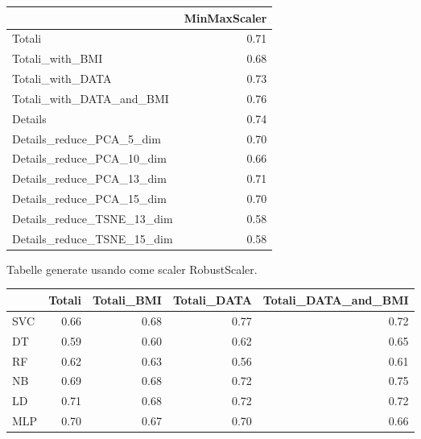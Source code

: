 \documentclass[12pt,italian]{report}
\begin{document}
\begin{table}[h]
	\begin{center}
		\begin{adjustbox}{max width=\textwidth, max totalheight={5.5cm}}
			\begin{tabular}{lr}
				\toprule
				{} &  MinMaxScaler \\
				\midrule
				Totali                     &      0.71 \\
				Totali\_with\_BMI            &      0.68 \\
				Totali\_with\_DATA           &      0.73 \\
				Totali\_with\_DATA\_and\_BMI   &      \cellcolor{orange}0.76 \\
				Details                    &      0.74 \\
				Details\_reduce\_PCA\_5\_dim   &      0.70 \\
				Details\_reduce\_PCA\_10\_dim  &      0.66 \\
				Details\_reduce\_PCA\_13\_dim  &      0.71 \\
				Details\_reduce\_PCA\_15\_dim  &      0.70 \\
				Details\_reduce\_TSNE\_13\_dim &      0.58 \\
				Details\_reduce\_TSNE\_15\_dim &      0.58 \\
				\bottomrule
			\end{tabular}
		\end{adjustbox}
	\end{center}
\end{table}

\newpage

Tabelle generate usando come scaler RobustScaler.
\begin{table}[h]
	\begin{center}
		\begin{adjustbox}{max width=\textwidth, max totalheight= {3.3cm}}
			\begin{tabular}{lrrrr}
				\toprule
				{} &    Totali &  Totali\_BMI &  Totali\_DATA &  Totali\_DATA\_and\_BMI \\
				\midrule
				SVC &  0.66 &         0.68 &          \cellcolor{orange}0.77 &                  0.72 \\
				DT  &  0.59 &         0.60 &          0.62 &                  0.65 \\
				RF  &  0.62 &         0.63 &          0.56 &                  0.61 \\
				NB  &  0.69 &         0.68 &          0.72 &                  \cellcolor{cyan}0.75 \\
				LD  &  0.71 &         0.68 &          \cellcolor{cyan}0.72 &                  0.72 \\
				MLP &  0.70 &         0.67 &          \cellcolor{cyan}0.70 &                  0.66 \\
				\bottomrule
			\end{tabular}
		\end{adjustbox}
	\end{center}
\end{table}
\end{document}
